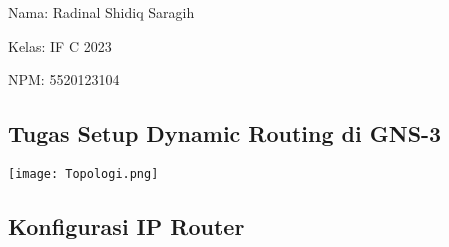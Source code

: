 \documentclass[12pt, a4paper]{article}
\date{}
\begin{document}
Nama: Radinal Shidiq Saragih

Kelas: IF C 2023

NPM: 5520123104

\begin{center}

  \section*{Tugas Setup Dynamic Routing di GNS-3}

  \vspace{0.5cm}

  \texttt{[image: Topologi.png]}

  \vspace{0.5cm}

\end{center}

\subsection*{Konfigurasi IP Router}
\end{document}

